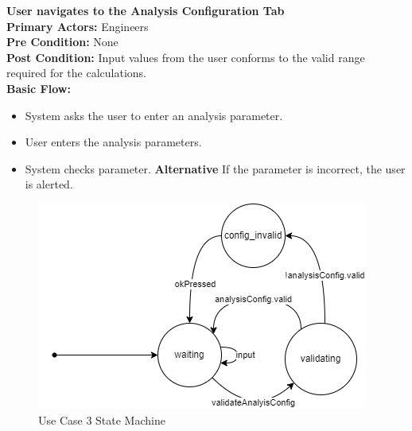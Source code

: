 \documentclass[12pt]{article}
\begin{document}
\noindent
\textbf{User navigates to the Analysis Configuration Tab} \\
\textbf{  Primary Actors:} Engineers\\
\textbf{  Pre Condition:} None\\
\textbf{  Post Condition:} Input values from the user conforms to the valid range required for the calculations.\\ 
\textbf{  Basic Flow:} 
\begin{itemize}
\item System asks the user to enter an analysis parameter. 
\item User enters the analysis parameters. 
\item System checks parameter.
\subitem \textbf{Alternative} If the parameter is incorrect, the user is alerted.
\end{itemize}
\begin{figure}[H]
  \centering
  \includegraphics[width=0.5\linewidth]{use-case-3-sm.png}
  \caption{Use Case 3 State Machine}
  \label {fig:use-case-3-sm}
\end{figure}
\end{document}
